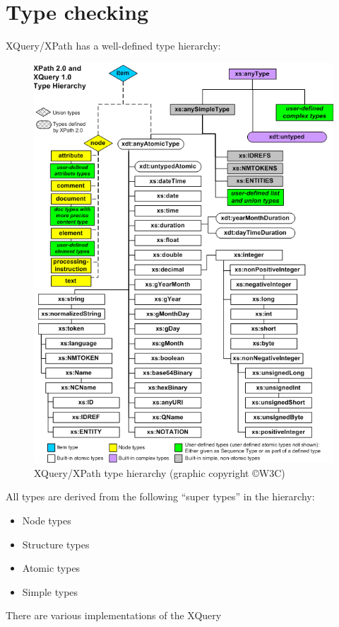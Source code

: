 \section{Type checking}
XQuery/XPath has a well-defined type hierarchy:
\begin{figure}[!h]
  \centering
    \includegraphics[scale=0.5]{img/xpathtypehierarchy}
  \caption{XQuery/XPath type hierarchy \cite{w3c04} (graphic copyright
  \copyright W3C)}
\end{figure}
All types are derived from the following ``super types'' in the hierarchy:
\begin{itemize}
  \item Node types
  \item Structure types
  \item Atomic types
  \item Simple types
\end{itemize}
There are various implementations of the XQuery